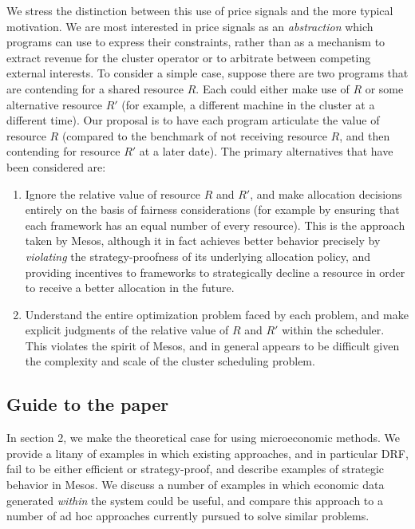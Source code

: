 \documentclass{acm_proc_article-sp}
\begin{document}
We stress the distinction between this use of price signals and the more typical
motivation. We are most interested in price signals as an \emph{abstraction} which
programs can use to express their constraints, rather than as a mechanism to
extract revenue for the cluster operator or to arbitrate between competing
external interests. To consider a simple case, suppose there are two programs
that are contending for a shared resource $R$. Each could either make use of $R$ or
some alternative resource $R'$ (for example, a different machine in the cluster at
a different time). Our proposal is to have each program articulate the value of
resource $R$ (compared to the benchmark of not receiving resource $R$, and then
contending for resource $R'$ at a later date). The primary alternatives that have
been considered are:
\begin{enumerate}
  \item Ignore the relative value of resource $R$ and $R'$, and make allocation
    decisions entirely on the basis of fairness considerations (for example by
    ensuring that each framework has an equal number of every resource). This is
    the approach taken by Mesos, although it in fact achieves better behavior
    precisely by \emph{violating} the strategy-proofness of its underlying allocation
    policy, and providing incentives to frameworks to strategically decline a
    resource in order to receive a better allocation in the future.
  \item Understand the entire optimization problem faced by each problem, and
    make explicit judgments of the relative value of $R$ and $R'$ within the
    scheduler. This violates the spirit of Mesos, and in general appears to be
    difficult given the complexity and scale of the cluster scheduling problem.
\end{enumerate}

\subsection{Guide to the paper}
In section 2, we make the theoretical case for using microeconomic methods. We
provide a litany of examples in which existing approaches, and in particular
DRF, fail to be either efficient or strategy-proof, and describe examples of
strategic behavior in Mesos. We discuss a number of examples in which economic
data generated \emph{within} the system could be useful, and compare this approach to a
number of ad hoc approaches currently pursued to solve similar problems.
\end{document}
